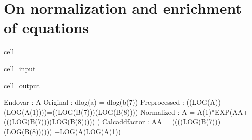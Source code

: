\documentclass[letterpaper,10pt,english]{jupyterBook}
\begin{document}
\section{On normalization and enrichment of equations}
\label{\detokenize{content/howto/smallmodel/modelstart:on-normalization-and-enrichment-of-equations}}
\begin{sphinxuseclass}{cell}\begin{sphinxVerbatimInput}

\begin{sphinxuseclass}{cell_input}
\begin{sphinxVerbatim}[commandchars=\\\{\}]
    
\end{sphinxVerbatim}

\end{sphinxuseclass}\end{sphinxVerbatimInput}
\begin{sphinxVerbatimOutput}

\begin{sphinxuseclass}{cell_output}
\begin{sphinxVerbatim}[commandchars=\\\{\}]
Endo\PYGZus{}var        : A
Original        : dlog(a) = dlog(b(\PYGZhy{}7)) 
Preprocessed    : ((LOG(A))\PYGZhy{}(LOG(A(\PYGZhy{}1))))=((LOG(B(\PYGZhy{}7)))\PYGZhy{}(LOG(B(\PYGZhy{}8))))
Normalized      : A = A(\PYGZhy{}1)*EXP(A\PYGZus{}A+ (((LOG(B(\PYGZhy{}7)))\PYGZhy{}(LOG(B(\PYGZhy{}8))))) )
Calc\PYGZus{}add\PYGZus{}factor : A\PYGZus{}A = \PYGZhy{} ((((LOG(B(\PYGZhy{}7)))\PYGZhy{}(LOG(B(\PYGZhy{}8)))))) +LOG(A)\PYGZhy{}LOG(A(\PYGZhy{}1))
\end{sphinxVerbatim}

\begin{sphinxVerbatim}[commandchars=\\\{\}]

\end{sphinxVerbatim}

\end{sphinxuseclass}\end{sphinxVerbatimOutput}

\end{sphinxuseclass}
\end{document}
